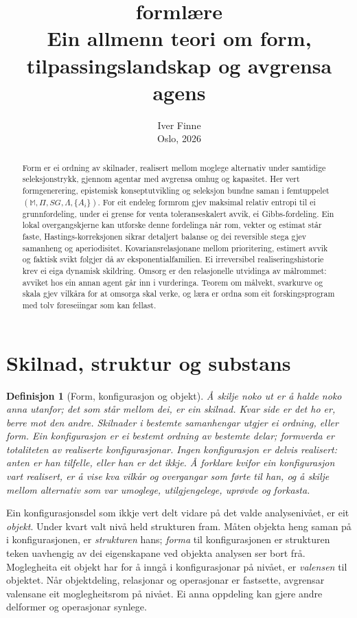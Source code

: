 \documentclass[9pt,twocolumn,a4paper]{article}
\title{\vspace{-1.2cm}\textbf{\large formlære}\\[0.2em]
\normalsize Ein allmenn teori om form, tilpassingslandskap og avgrensa agens}
\author{\small Iver Finne \\ \scriptsize Oslo, 2026}
\date{}
\theoremstyle{defstyle}
\newtheorem{definisjon}{Definisjon}
\theoremstyle{formstyle}
\begin{document}
\maketitle
\vspace{-0.8cm}

\begin{abstract}
\noindent Form er ei ordning av skilnader, realisert mellom moglege alternativ under samtidige seleksjonstrykk, gjennom agentar med avgrensa omhug og kapasitet. Her vert formgenerering, epistemisk konseptutvikling og seleksjon bundne saman i femtuppelet $(\mathbb{M}, \Pi, SG, \Lambda, \{A_i\})$. For eit endeleg formrom gjev maksimal relativ entropi til ei grunnfordeling, under ei grense for venta toleranseskalert avvik, ei Gibbs-fordeling. Ein lokal overgangskjerne kan utforske denne fordelinga når rom, vekter og estimat står faste, Hastings-korreksjonen sikrar detaljert balanse og dei reversible stega gjev samanheng og aperiodisitet. Kovariansrelasjonane mellom prioritering, estimert avvik og faktisk svikt følgjer då av eksponentialfamilien. Ei irreversibel realiseringshistorie krev ei eiga dynamisk skildring. Omsorg er den relasjonelle utvidinga av målrommet: avviket hos ein annan agent går inn i vurderinga. Teorem om målvekt, svarkurve og skala gjev vilkåra for at omsorga skal verke, og læra er ordna som eit forskingsprogram med tolv føreseiingar som kan fellast.
\end{abstract}

\section{Skilnad, struktur og substans}

\begin{definisjon}[Form, konfigurasjon og objekt]
Å skilje noko ut er å halde noko anna utanfor; det som står mellom dei, er ein \emph{skilnad}. Kvar side er det ho er, berre mot den andre. Skilnader i bestemte samanhengar utgjer ei \emph{ordning}, eller \emph{form}. Ein \emph{konfigurasjon} er ei bestemt ordning av bestemte delar; \emph{formverda} er totaliteten av realiserte konfigurasjonar. Ingen konfigurasjon er delvis realisert: anten er han tilfelle, eller han er det ikkje. Å forklare kvifor ein konfigurasjon vart realisert, er å vise kva vilkår og overgangar som førte til han, og å skilje mellom alternativ som var \emph{umoglege}, \emph{utilgjengelege}, \emph{uprøvde} og \emph{forkasta}.
\end{definisjon}

Ein konfigurasjonsdel som ikkje vert delt vidare på det valde analysenivået, er eit \emph{objekt}. Under kvart valt nivå held strukturen fram. Måten objekta heng saman på i konfigurasjonen, er \emph{strukturen} hans; \emph{forma} til konfigurasjonen er strukturen teken uavhengig av dei eigenskapane ved objekta analysen ser bort frå. Moglegheita eit objekt har for å inngå i konfigurasjonar på nivået, er \emph{valensen} til objektet. Når objektdeling, relasjonar og operasjonar er fastsette, avgrensar valensane eit moglegheitsrom på nivået. Ei anna oppdeling kan gjere andre delformer og operasjonar synlege.
\end{document}
